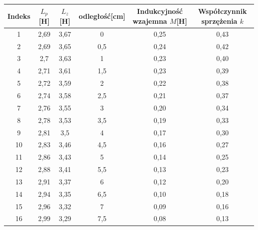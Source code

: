 \documentclass[a4paper,10pt,twoside]{article}
\begin{document}
\begin{table}[htb]
	\begin{tabular}{|c|c|c|c|c|c|}
		\hline
		Indeks & $L_p$ {[}H{]} & $L_z$ {[}H{]} & odległość[cm] & Indukcyjność wzajemna $M${[}H{]} & Współczynnik sprzężenia $k$ \\ \hline
		1      & 2,69       & 3,67 & 0       & 0,25                          & 0,43                      \\ \hline
		2      & 2,69       & 3,65 & 0,5     & 0,24                          & 0,42                      \\ \hline
		3      & 2,7        & 3,63 & 1       & 0,23                          & 0,40                      \\ \hline
		4      & 2,71       & 3,61 & 1,5     & 0,23                          & 0,39                      \\ \hline
		5      & 2,72       & 3,59 & 2       & 0,22                          & 0,38                      \\ \hline
		6      & 2,74       & 3,58 & 2,5     & 0,21                          & 0,37                      \\ \hline
		7      & 2,76       & 3,55 & 3       & 0,20                          & 0,34                      \\ \hline
		8      & 2,78       & 3,53 & 3,5     & 0,19                          & 0,33                      \\ \hline
		9      & 2,81       & 3,5  & 4       & 0,17                          & 0,30                      \\ \hline
		10     & 2,83       & 3,46 & 4,5     & 0,16                          & 0,27                      \\ \hline
		11     & 2,86       & 3,43 & 5       & 0,14                          & 0,25                      \\ \hline
		12     & 2,88       & 3,41 & 5,5     & 0,13                          & 0,23                      \\ \hline
		13     & 2,91       & 3,37 & 6       & 0,12                          & 0,20                      \\ \hline
		14     & 2,94       & 3,35 & 6,5     & 0,10                          & 0,18                      \\ \hline
		15     & 2,96       & 3,32 & 7       & 0,09                          & 0,16                      \\ \hline
		16     & 2,99       & 3,29 & 7,5     & 0,08                          & 0,13                      \\ \hline

\end{tabular}
\end{table}
\end{document}

